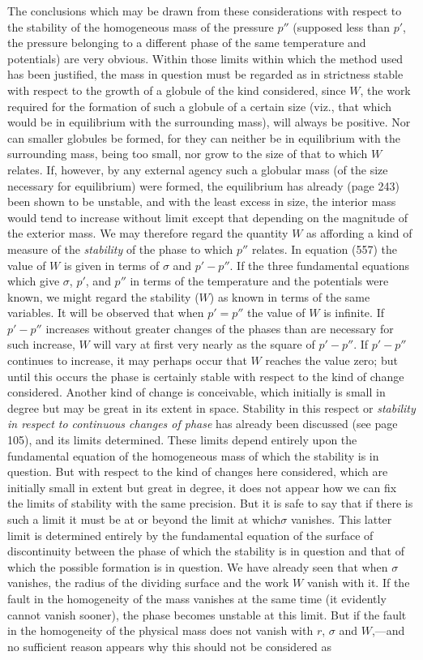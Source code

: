 \documentclass[12pt]{memoir}
\begin{document}
{The conclusions which may be drawn from these considerations with respect to the stability of the homogeneous mass of the pressure $p''$ (supposed less than $p'$, the pressure belonging to a different phase of the same temperature and potentials) are very obvious. Within those limits within which the method used has been justified, the mass in question must be regarded as in strictness stable with respect to the growth of a globule of the kind considered, since $W$, the work required for the formation of such a globule of a certain size (viz., that which would be in equilibrium with the surrounding mass), will always be positive.
Nor can smaller globules be formed, for they can neither be in equilibrium with the surrounding mass, being too small, nor grow to the size of that to which $W$ relates. If, however, by any external agency such a globular mass (of the size necessary for equilibrium) were formed, the equilibrium has already (page 243) been shown to be unstable, and with the least excess in size, the interior mass would tend to increase without limit except that depending on the magnitude of the exterior mass. We may therefore regard the quantity $W$ as affording a kind of measure of the \textit{stability} of the phase to which $p''$ relates. In equation (557) the value of $W$ is given in terms of $\sigma$ and $p'-p''$. If the three fundamental equations which give $\sigma$, $p'$, and $p''$ in terms of the temperature and the potentials were known, we might regard the stability ($W$) as known in terms of the same variables. It will be observed that when $p'=p''$ the value of $W$ is infinite. If $p'-p''$ increases without greater changes of the phases than are necessary for such increase, $W$ will vary at first very nearly as the square of $p'-p''$. If $p'-p''$ continues to increase, it may perhaps occur that $W$ reaches the value zero; but until this occurs the phase is certainly stable with respect to the kind of change considered. Another kind of change is conceivable, which initially is small in degree but may be great in its extent in space. Stability in this respect or \emph{stability in respect to continuous changes of phase} has already been discussed (see page 105), and its limits determined. These limits depend entirely upon the fundamental equation of the homogeneous mass of which the stability is in question. But with respect to the kind of changes here considered, which are initially small in extent but great in degree, it does not appear how we can fix the limits of stability with the same precision. But it is safe to say that if there is such a limit it must be at or beyond the limit at which$\sigma$ vanishes. This latter limit is determined entirely by the fundamental equation of the surface of discontinuity between the phase of which the stability is in question and that of which the possible formation is in question. We have already seen that when $\sigma$ vanishes, the radius of the dividing surface and the work $W$ vanish with it. If the fault in the homogeneity of the mass vanishes at the same time (it evidently cannot vanish sooner), the phase becomes unstable at this limit. But if the fault in the homogeneity of the physical mass does not vanish with $r$, $\sigma$ and $W$,---and no sufficient reason appears why this should not be considered as }
\end{document}
